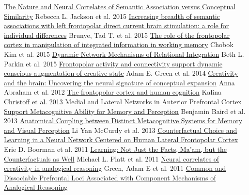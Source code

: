 \documentclass[11pt,a4paper]{article}
\begin{document}
\begin{thebibliography}{9}
  \href{http://cercor.oxfordjournals.org/content/early/2015/01/30/cercor.bhv003.short}{The Nature and Neural Correlates of Semantic Association versus Conceptual Similarity}
  Rebecca L. Jackson et al. 2015
  \href{http://journals.lww.com/neuroreport/Abstract/2015/03020/Increasing_breadth_of_semantic_associations_with.13.aspx}{Increasing breadth of semantic associations with left frontopolar direct current brain stimulation: a role for individual differences}
  Brunye, Tad T. et al. 2015
  \href{http://www.sciencedirect.com/science/article/pii/S0304394015002372}{The role of the frontopolar cortex in manipulation of integrated information in working memory}
  Chobok Kim et al. 2015
  \href{http://www.jneurosci.org/content/35/20/7660.short}{Dynamic Network Mechanisms of Relational Integration}
  Beth L. Parkin et al. 2015
  \href{http://onlinelibrary.wiley.com/doi/10.1002/hbm.22676/full}{Frontopolar activity and connectivity support dynamic conscious augmentation of creative state}
  Adam E. Green et al. 2014
  \href{http://www.sciencedirect.com/science/article/pii/S0028393212001728}{Creativity and the brain: Uncovering the neural signature of conceptual expansion}
  Anna Abraham et al. 2012
  \href{http://link.springer.com/article/10.3758/BF03331976}{The frontopolar cortex and human cognition}
  Kalina Christoff et al. 2013
  \href{http://www.jneurosci.org/content/33/42/16657.short}{Medial and Lateral Networks in Anterior Prefrontal Cortex Support Metacognitive Ability for Memory and Perception}
  Benjamin Baird et al. 2013
  \href{http://www.jneurosci.org/content/33/5/1897.short}{Anatomical Coupling between Distinct Metacognitive Systems for Memory and Visual Perception}
  Li Yan McCurdy et al. 2013
  \href{http://journals.plos.org/plosbiology/article?id=10.1371/journal.pbio.1001093}{Counterfactual Choice and Learning in a Neural Network Centered on Human Lateral Frontopolar Cortex}
  Erie D. Boorman et al. 2011
  \href{http://journals.plos.org/plosbiology/article?id=10.1371/journal.pbio.1001092}{Learning: Not Just the Facts, Ma'am, but the Counterfactuals as Well}
  Michael L. Platt et al. 2011
  \href{http://psycnet.apa.org/journals/xlm/38/2/264/}{Neural correlates of creativity in analogical reasoning}
  Green, Adam E et al. 2011
  \href{http://cercor.oxfordjournals.org/content/20/3/524.short}{Common and Dissociable Prefrontal Loci Associated with Component Mechanisms of Analogical Reasoning}

\end{thebibliography}
\end{document}
